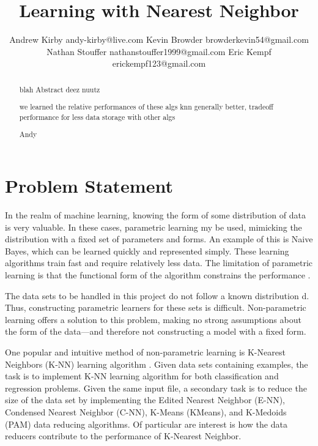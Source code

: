 \documentclass[twoside,11pt]{article}
\begin{document}
\title{Learning with Nearest Neighbor}

\author{\name Andrew Kirby \email andy-kirby@live.com \AND
		\name Kevin Browder \email browderkevin54@gmail.com \AND
		\name Nathan Stouffer \email nathanstouffer1999@gmail.com \AND
		\name Eric Kempf \email erickempf123@gmail.com }

\maketitle

\begin{abstract}
	blah Abstract deez nuutz

	we learned the relative performances of these algs
	knn generally better, tradeoff performance for less data storage with other algs

	Andy

\end{abstract}

\section{Problem Statement}

In the realm of machine learning, knowing the form of some distribution of data is very valuable. In these cases, parametric learning my be used, mimicking the distribution with a fixed set of parameters and forms. An example of this is Naive Bayes, which can be learned quickly and represented simply. These learning algorithms train fast and require relatively less data. The limitation of parametric learning is that the functional form of the algorithm constrains the performance \citep{distance-k-nn}.

The data sets to be handled in this project do not follow a known distribution \citep{datasets}d. Thus, constructing parametric learners for these sets is difficult. Non-parametric learning offers a solution to this problem, making no strong assumptions about the form of the data---and therefore not constructing a model with a fixed form.

One popular and intuitive method of non-parametric learning is K-Nearest Neighbors (K-NN) learning algorithm \citep{NNClassificationOrigPaper}. Given data sets containing examples, the task is to implement K-NN learning algorithm for both classification and regression problems. Given the same input file, a secondary task is to reduce the size of the data set by implementing the Edited Nearest Neighbor (E-NN), Condensed Nearest Neighbor (C-NN), K-Means (KMeans), and K-Medoids (PAM) data reducing algorithms. Of particular are interest is how the data reducers contribute to the performance of K-Nearest Neighbor.
\end{document}

